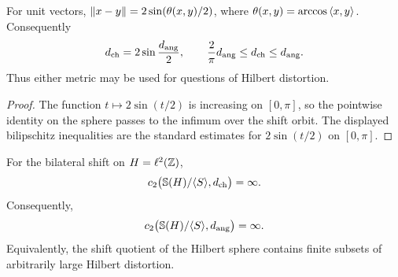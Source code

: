 \begin{proposition}
\label{prop:chordal-angular-equivalence}
\leanok
{}
For unit vectors, $\left\lVert x-y\right\rVert=2\sin(\theta(x,y)/2)$, where
$\theta(x,y)=\arccos\left\langle x,y\right\rangle$.  Consequently
\begin{equation}\label{eq:metric-equivalence}
        d_{\rm ch}=2\sin\frac{d_{\rm ang}}2,
        \qquad
        \frac2\pi d_{\rm ang}\le d_{\rm ch}\le d_{\rm ang}.
\end{equation}
Thus either metric may be used for questions of Hilbert distortion.
\end{proposition}

\begin{proof}
The function $t\mapsto2\sin(t/2)$ is increasing on $[0,\pi]$, so the pointwise
identity on the sphere passes to the infimum over the shift orbit.  The displayed
bilipschitz inequalities are the standard estimates for $2\sin(t/2)$ on
$[0,\pi]$.
\end{proof}

\begin{theorem}\label{thm:main}
\leanok
{}
For the bilateral shift on $H=\ell^2(\mathbb Z)$,
\[
        c_2\bigl(\mathbb S(H)/\langle S\rangle,d_{\rm ch}\bigr)=\infty.
\]
Consequently,
\[
        c_2\bigl(\mathbb S(H)/\langle S\rangle,d_{\rm ang}\bigr)=\infty.
\]
Equivalently, the shift quotient of the Hilbert sphere contains finite subsets
of arbitrarily large Hilbert distortion.
\end{theorem}
